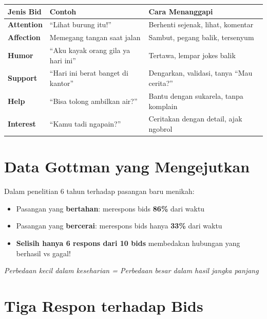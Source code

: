 \begin{center}
\renewcommand{\arraystretch}{1.5}
\begin{tabular}{|>{\raggedright}p{3cm}|>{\raggedright}p{5cm}|>{\raggedright\arraybackslash}p{7cm}|}
\hline
\rowcolor{primary!20}
\textbf{Jenis Bid} & \textbf{Contoh} & \textbf{Cara Menanggapi} \\
\hline
\textbf{Attention} & ``Lihat burung itu!'' & Berhenti sejenak, lihat, komentar \\
\hline
\textbf{Affection} & Memegang tangan saat jalan & Sambut, pegang balik, tersenyum \\
\hline
\textbf{Humor} & ``Aku kayak orang gila ya hari ini'' & Tertawa, lempar jokes balik \\
\hline
\textbf{Support} & ``Hari ini berat banget di kantor'' & Dengarkan, validasi, tanya ``Mau cerita?'' \\
\hline
\textbf{Help} & ``Bisa tolong ambilkan air?'' & Bantu dengan sukarela, tanpa komplain \\
\hline
\textbf{Interest} & ``Kamu tadi ngapain?'' & Ceritakan dengan detail, ajak ngobrol \\
\hline
\end{tabular}
\end{center}

\section{Data Gottman yang Mengejutkan}

\begin{warningbox}
Dalam penelitian 6 tahun terhadap pasangan baru menikah:
\begin{itemize}
    \item Pasangan yang \textbf{bertahan}: merespons bids \textbf{86\%} dari waktu
    \item Pasangan yang \textbf{bercerai}: merespons bids hanya \textbf{33\%} dari waktu
    \item \textbf{Selisih hanya 6 respons dari 10 bids} membedakan hubungan yang berhasil vs gagal!
\end{itemize}

\textit{Perbedaan kecil dalam keseharian = Perbedaan besar dalam hasil jangka panjang}
\end{warningbox}

\section{Tiga Respon terhadap Bids}

